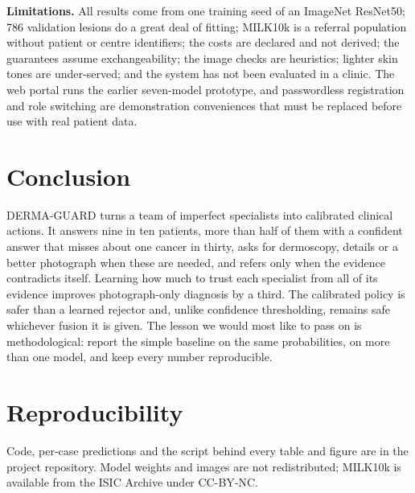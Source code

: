 \documentclass[conference]{IEEEtran}
\begin{document}
\textbf{Limitations.} All results come from one training seed of an ImageNet ResNet50; 786 validation lesions do a great deal of fitting; MILK10k is a referral population without patient or centre identifiers; the costs are declared and not derived; the guarantees assume exchangeability; the image checks are heuristics; lighter skin tones are under-served; and the system has not been evaluated in a clinic. The web portal runs the earlier seven-model prototype, and passwordless registration and role switching are demonstration conveniences that must be replaced before use with real patient data.

\section{Conclusion}
DERMA-GUARD turns a team of imperfect specialists into calibrated clinical actions. It answers nine in ten patients, more than half of them with a confident answer that misses about one cancer in thirty, asks for dermoscopy, details or a better photograph when these are needed, and refers only when the evidence contradicts itself. Learning how much to trust each specialist from all of its evidence improves photograph-only diagnosis by a third. The calibrated policy is safer than a learned rejector and, unlike confidence thresholding, remains safe whichever fusion it is given. The lesson we would most like to pass on is methodological: report the simple baseline on the same probabilities, on more than one model, and keep every number reproducible.

\section*{Reproducibility}
Code, per-case predictions and the script behind every table and figure are in the project repository. Model weights and images are not redistributed; MILK10k is available from the ISIC Archive under CC-BY-NC.
\end{document}
